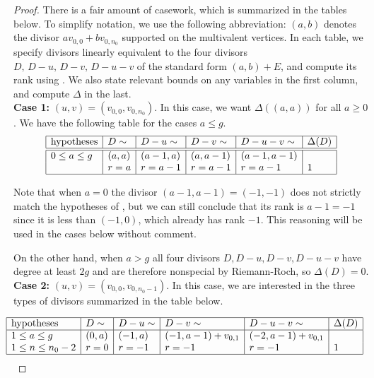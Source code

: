\begin{proof}
    \newcommand{\topv}{v_{0,0}}
    \newcommand{\botv}{v_{0,n_0}}

    \newcommand{\tbc}[2]{(#1,#2)}
    
   There is a fair amount of casework, which is summarized in the tables below. To simplify notation, we use the following abbreviation: $(a,b)$ denotes the divisor $a v_{0,0} + b v_{0,n_0}$ supported on the multivalent vertices. In each table, we specify divisors linearly equivalent to the four divisors $D,\, D-u,\, D-v,\, D-u-v$ of the standard form $(a,b) + E$, and compute its rank using . We also state relevant bounds on any variables in the first column, and compute $\Delta$ in the last.\\

    \noindent\textbf{Case 1:} $(u,v) = (v_{0,0},v_{0,n_0})$. In this case, we want $\Delta( (a,a) )$ for all $a \geq 0$. We have the following table for the cases $a \leq g$.
    \[\begin{array}{|l|l|l|l|l|l|}
    \hline
    \mathrm{hypotheses} & D\sim & D-u\sim & D-v\sim & D-u-v\sim & \Delta(D)\\ \hline\hline
    0 \leq a \leq g
    & \tbc{a}{a} %
    & \tbc{a-1}{a} %
    & \tbc{a}{a-1} %
    & \tbc{a-1}{a-1} %
    & \empty
    \\
    \empty
    & r = a
    & r= a-1
    & r= a-1
    & r= a-1
    & 1
    \\\hline


    \end{array}\]

    Note that when $a=0$ the divisor $(a-1,a-1) = (-1,-1)$ does not strictly match the hypotheses of , but we can still conclude that its rank is $a-1 = -1$ since it is less than $(-1,0)$, which already has rank $-1$. This reasoning will be used in the cases below without comment.

    On the other hand, when $a > g$ all four divisors $D,D-u,D-v,D-u-v$ have degree at least $2g$ and are therefore nonspecial by Riemann-Roch, so $\Delta(D) = 0$.\\

    \noindent\textbf{Case 2:} $(u,v) = (\topv, v_{0,n_0-1})$. In this case, we are interested in the three types of divisors summarized in the table below.
    
{\footnotesize\[
    \hspace{-.5cm}\begin{array}{|l|l|l|l|l|l|}
    \hline
    \mathrm{hypotheses} & D\sim & D-u\sim & D-v\sim & D-u-v\sim & \Delta(D)\\\hline
    1 \leq a \leq g
    & \tbc{0}{a} %
    & \tbc{-1}{a} %
    & \tbc{-1}{a-1} + v_{0,1}
    & \tbc{-2}{a-1} + v_{0,1}
    &
    \\
    1 \leq n \leq n_0-2
    & r = 0
    & r = -1
    & r = -1
    & r = -1 
    & 1
    \\\hline


\end{array}\]}
\end{proof}
